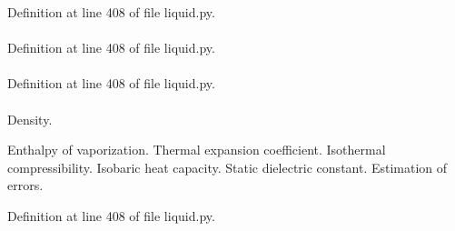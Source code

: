 \-Definition at line 408 of file liquid.\-py.

\hypertarget{classforcebalance_1_1liquid_1_1Liquid_a7f43411fa6a9c39b63f1e82fe78ea597}{
\paragraph[{w\-\_\-hvap}]{}}\label{classforcebalance_1_1liquid_1_1Liquid_a7f43411fa6a9c39b63f1e82fe78ea597}


\-Definition at line 408 of file liquid.\-py.

\hypertarget{classforcebalance_1_1liquid_1_1Liquid_a19f8897aad045e3bf51eedba4606ac87}{
\paragraph[{w\-\_\-kappa}]{}}\label{classforcebalance_1_1liquid_1_1Liquid_a19f8897aad045e3bf51eedba4606ac87}


\-Definition at line 408 of file liquid.\-py.

\hypertarget{classforcebalance_1_1liquid_1_1Liquid_a677f8c01349a91716e10353633a4c5c1}{
\paragraph[{w\-\_\-rho}]{}}\label{classforcebalance_1_1liquid_1_1Liquid_a677f8c01349a91716e10353633a4c5c1}


\-Density. 

\-Enthalpy of vaporization. \-Thermal expansion coefficient. \-Isothermal compressibility. \-Isobaric heat capacity. \-Static dielectric constant. \-Estimation of errors. 

\-Definition at line 408 of file liquid.\-py.

